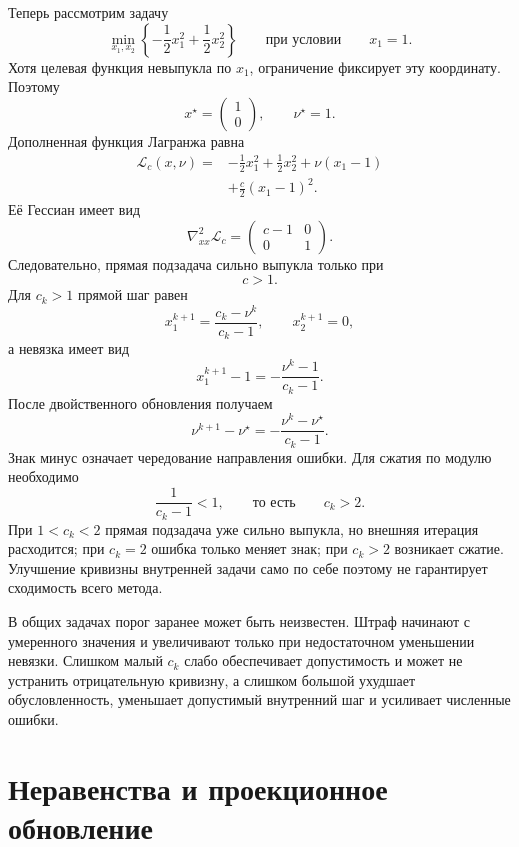 Теперь рассмотрим задачу
\[
    \min_{x_1,x_2}
    \left\{
        -\frac12x_1^2+\frac12x_2^2
    \right\}
    \qquad
    \text{при условии}
    \qquad
    x_1=1.
\]
Хотя целевая функция невыпукла по \(x_1\), ограничение фиксирует эту
координату. Поэтому
\[
    x^\star=
    \begin{pmatrix}
        1\\
        0
    \end{pmatrix},
    \qquad
    \nu^\star=1.
\]
Дополненная функция Лагранжа равна
\[
\begin{aligned}
    \mathcal L_c(x,\nu)
    ={}&
    -\frac12x_1^2
    +
    \frac12x_2^2
    +
    \nu(x_1-1)
    \\
    &+
    \frac c2(x_1-1)^2.
\end{aligned}
\]
Её Гессиан имеет вид
\[
    \nabla^2_{xx}\mathcal L_c
    =
    \begin{pmatrix}
        c-1&0\\
        0&1
    \end{pmatrix}.
\]
Следовательно, прямая подзадача сильно выпукла только при
\[
    c>1.
\]
Для \(c_k>1\) прямой шаг равен
\[
    x_1^{k+1}
    =
    \frac{c_k-\nu^k}{c_k-1},
    \qquad
    x_2^{k+1}=0,
\]
а невязка имеет вид
\[
    x_1^{k+1}-1
    =
    -\frac{\nu^k-1}{c_k-1}.
\]
После двойственного обновления получаем
\[
    \nu^{k+1}-\nu^\star
    =
    -\frac{\nu^k-\nu^\star}{c_k-1}.
\]
Знак минус означает
чередование направления ошибки. Для сжатия по модулю необходимо
\[
    \frac1{c_k-1}<1,
    \qquad
    \text{то есть}
    \qquad
    c_k>2.
\]
При \(1<c_k<2\) прямая подзадача уже сильно выпукла, но внешняя
итерация расходится; при \(c_k=2\) ошибка только меняет знак; при
\(c_k>2\) возникает сжатие. Улучшение кривизны внутренней задачи само
по себе поэтому не гарантирует сходимость всего метода.

В общих задачах порог заранее может быть неизвестен. Штраф начинают с
умеренного значения и увеличивают только при недостаточном уменьшении
невязки. Слишком малый \(c_k\) слабо обеспечивает допустимость и может
не устранить отрицательную кривизну, а слишком большой ухудшает
обусловленность, уменьшает допустимый внутренний шаг и усиливает
численные ошибки.

\section{Неравенства и проекционное обновление}

